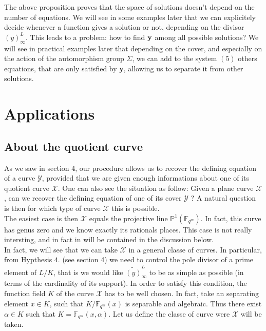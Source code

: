 \documentclass[10pt]{article}
\newcommand{\s}{\vspace{0.3cm}}
\newcommand{\PP}{\mathbb{P}}
\newcommand{\fqm}{\mathbb{F}_{q^m}}
\newcommand{\X}{\mathcal{X}}
\newcommand{\Y}{\mathcal{Y}}
\begin{document}
\s

The above proposition proves that the space of solutions doesn't depend on the number of equations. 
We will see in some examples later that we can explicitely decide whenever a function gives a solution or not, depending on the divisor $(y)^L_{\infty}$. This leads to a problem: how to find $\bf{y}$ \rm among all possible solutions? We will see in practical examples later that depending on the cover, and especially on the action of the automorphism group $\Sigma$,  we can add to the system $(5)$ others equations, that are only satisfied by \textbf{y}, allowing us to separate it from other solutions.

\s
\section{Applications}

\s

\subsection{About the quotient curve}

\s


As we saw in section 4, our procedure allows us to recover the defining equation of a curve $\Y$, provided that we are given enough informations about one of its quotient curve $\X$. One can also see the situation as follow: Given a plane curve $\X$, can we recover the defining equation of one of its cover $\Y$ ? A natural question is then for which type of curve $\X$ this is possible. \\


The easiest case is then $\X$ equals the projective line $\PP^1(\fqm)$. In fact, this curve has genus zero and we know exactly its rationals places. This case is not really intersting, and in fact in will be contained in the discussion below.\\

In fact, we will see that we can take $\X$ in a general classe of curves. In particular, from Hypthesis $4.$ (see section 4) we need to control the pole divisor of a prime element of $L/K$, that is we would like $\widetilde{(y)}^L_{\infty}$ to be as simple as possible (in terms of the cardinality of its support). In order to satisfy this condition, the function field $K$ of the curve $\X$ has to be well chosen. In fact, take an separating element $x \in K$, such that $K/\fqm(x)$ is separable and algebraic. Thus there exist $\alpha \in K$ such that $K=\fqm(x,\alpha)$. Let us define the classe of curve were $\X$ will be taken.
\end{document}
